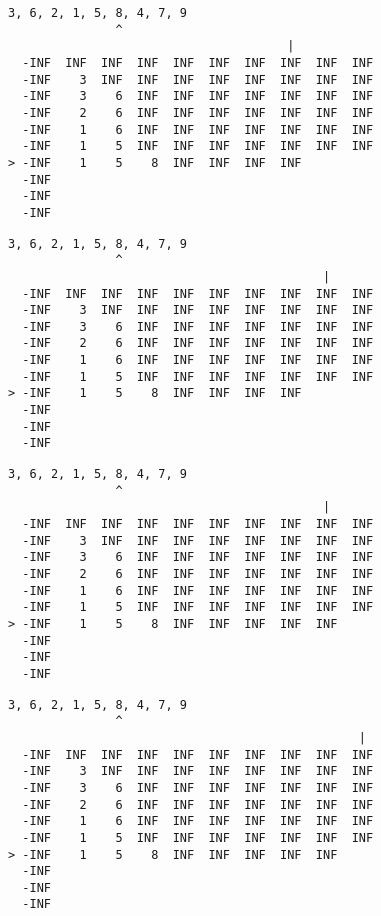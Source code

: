 { \begin{verbatim}
3, 6, 2, 1, 5, 8, 4, 7, 9
               ^
                                       |
  -INF  INF  INF  INF  INF  INF  INF  INF  INF  INF
  -INF    3  INF  INF  INF  INF  INF  INF  INF  INF
  -INF    3    6  INF  INF  INF  INF  INF  INF  INF
  -INF    2    6  INF  INF  INF  INF  INF  INF  INF
  -INF    1    6  INF  INF  INF  INF  INF  INF  INF
  -INF    1    5  INF  INF  INF  INF  INF  INF  INF
> -INF    1    5    8  INF  INF  INF  INF          
  -INF                                             
  -INF                                             
  -INF                                             
\end{verbatim} }

{ \begin{verbatim}
3, 6, 2, 1, 5, 8, 4, 7, 9
               ^
                                            |
  -INF  INF  INF  INF  INF  INF  INF  INF  INF  INF
  -INF    3  INF  INF  INF  INF  INF  INF  INF  INF
  -INF    3    6  INF  INF  INF  INF  INF  INF  INF
  -INF    2    6  INF  INF  INF  INF  INF  INF  INF
  -INF    1    6  INF  INF  INF  INF  INF  INF  INF
  -INF    1    5  INF  INF  INF  INF  INF  INF  INF
> -INF    1    5    8  INF  INF  INF  INF          
  -INF                                             
  -INF                                             
  -INF                                             
\end{verbatim} }

{ \begin{verbatim}
3, 6, 2, 1, 5, 8, 4, 7, 9
               ^
                                            |
  -INF  INF  INF  INF  INF  INF  INF  INF  INF  INF
  -INF    3  INF  INF  INF  INF  INF  INF  INF  INF
  -INF    3    6  INF  INF  INF  INF  INF  INF  INF
  -INF    2    6  INF  INF  INF  INF  INF  INF  INF
  -INF    1    6  INF  INF  INF  INF  INF  INF  INF
  -INF    1    5  INF  INF  INF  INF  INF  INF  INF
> -INF    1    5    8  INF  INF  INF  INF  INF     
  -INF                                             
  -INF                                             
  -INF                                             
\end{verbatim} }

{ \begin{verbatim}
3, 6, 2, 1, 5, 8, 4, 7, 9
               ^
                                                 |
  -INF  INF  INF  INF  INF  INF  INF  INF  INF  INF
  -INF    3  INF  INF  INF  INF  INF  INF  INF  INF
  -INF    3    6  INF  INF  INF  INF  INF  INF  INF
  -INF    2    6  INF  INF  INF  INF  INF  INF  INF
  -INF    1    6  INF  INF  INF  INF  INF  INF  INF
  -INF    1    5  INF  INF  INF  INF  INF  INF  INF
> -INF    1    5    8  INF  INF  INF  INF  INF     
  -INF                                             
  -INF                                             
  -INF                                             
\end{verbatim} }

